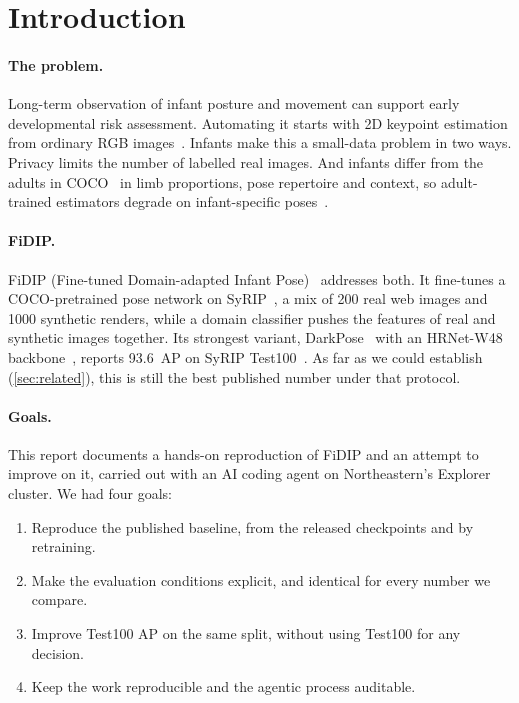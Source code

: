 \section{Introduction}\label{sec:intro}

\paragraph{The problem.} Long-term observation of infant posture and movement can support early developmental risk assessment. Automating it starts with 2D keypoint estimation from ordinary RGB images~\citep{huang2021fidip}.
Infants make this a small-data problem in two ways. Privacy limits the number of labelled real images. And infants differ from the adults in COCO~\citep{lin2014coco} in limb proportions, pose repertoire and context, so adult-trained estimators degrade on infant-specific poses~\citep{huang2021fidip}.

\paragraph{FiDIP.} FiDIP (Fine-tuned Domain-adapted Infant Pose)~\citep{huang2021fidip} addresses both. It fine-tunes a COCO-pretrained pose network on SyRIP~\citep{syripdata}, a mix of 200 real web images and 1000 synthetic renders, while a domain classifier pushes the features of real and synthetic images together.
Its strongest variant, DarkPose~\citep{zhang2020darkpose} with an HRNet-W48 backbone~\citep{sun2019hrnet}, reports 93.6~AP on SyRIP Test100~\citep{fidipcode}. As far as we could establish (\cref{sec:related}), this is still the best published number under that protocol.

\paragraph{Goals.} This report documents a hands-on reproduction of FiDIP and an attempt to improve on it, carried out with an AI coding agent on Northeastern's Explorer cluster. We had four goals:
\begin{enumerate}[label=\textbf{(G\arabic*)}, leftmargin=*]
  \item Reproduce the published baseline, from the released checkpoints and by retraining.
  \item Make the evaluation conditions explicit, and identical for every number we compare.
  \item Improve Test100 AP on the same split, without using Test100 for any decision.
  \item Keep the work reproducible and the agentic process auditable.
\end{enumerate}

